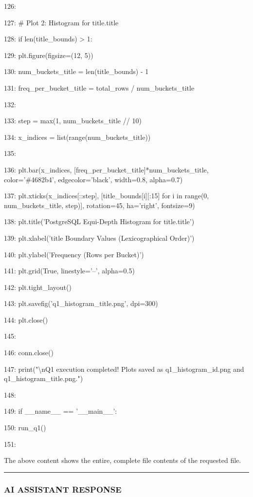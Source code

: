 \documentclass[11pt,a4paper]{article}
\begin{document}
{126:

127:     \# Plot 2: Histogram for title.title

128:     if len(title\_bounds) > 1:

129:         plt.figure(figsize=(12, 5))

130:         num\_buckets\_title = len(title\_bounds) - 1

131:         freq\_per\_bucket\_title = total\_rows / num\_buckets\_title

132:

133:         step = max(1, num\_buckets\_title // 10)

134:         x\_indices = list(range(num\_buckets\_title))

135:

136:         plt.bar(x\_indices, [freq\_per\_bucket\_title]*num\_buckets\_title, color='\#4682b4', edgecolor='black', width=0.8, alpha=0.7)

137:         plt.xticks(x\_indices[::step], [title\_bounds[i][:15] for i in range(0, num\_buckets\_title, step)], rotation=45, ha='right', fontsize=9)

138:         plt.title('PostgreSQL Equi-Depth Histogram for title.title')

139:         plt.xlabel('title Boundary Values (Lexicographical Order)')

140:         plt.ylabel('Frequency (Rows per Bucket)')

141:         plt.grid(True, linestyle='--', alpha=0.5)

142:         plt.tight\_layout()

143:         plt.savefig('q1\_histogram\_title.png', dpi=300)

144:         plt.close()

145:

146:     conn.close()

147:     print("\textbackslash{}nQ1 execution completed! Plots saved as q1\_histogram\_id.png and q1\_histogram\_title.png.")

148:

149: if \_\_name\_\_ == '\_\_main\_\_':

150:     run\_q1()

151:

The above content shows the entire, complete file contents of the requested file.


\hrule

\subsubsection{AI ASSISTANT RESPONSE}

}
\end{document}
